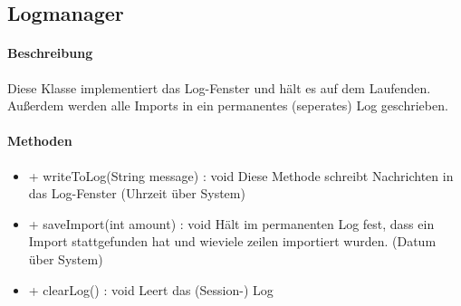 \subsection{Logmanager}

\paragraph{Beschreibung}
Diese Klasse implementiert das Log-Fenster und hält es auf dem Laufenden.
Außerdem werden alle Imports in ein permanentes (seperates) Log geschrieben.
\paragraph{Methoden}

\begin{itemize}
\item + writeToLog(String message) : void
Diese Methode schreibt Nachrichten in das Log-Fenster (Uhrzeit über System)
\item + saveImport(int amount) : void
Hält im permanenten Log fest, dass ein Import stattgefunden hat und wieviele zeilen importiert wurden. (Datum über System) 
\item + clearLog() : void
Leert das (Session-) Log
\end{itemize}